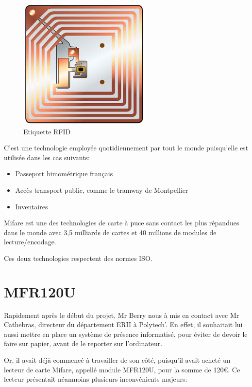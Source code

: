     \begin{figure}[h]
        \begin{center}
            \includegraphics[scale=0.6]{RFIDtag.jpg} 
        \end{center}

        \caption{Etiquette RFID}
        \label{Etiquette RFID}
    \end{figure}


C'est une technologie employée quotidiennement par tout le monde puisqu'elle
est utilisée dans les cas suivants:

    \begin{itemize}
    \item Passeport bimométrique français
    \item Accès transport public, comme le tramway de Montpellier
    \item Inventaires
    \end{itemize}

Mifare est une des technologies de carte à puce sans contact les plus répandues
dans le monde avec 3,5 milliards de cartes et 40 millions de modules de lecture/encodage.

Ces deux technologies respectent des normes ISO.

\section{MFR120U}

Rapidement après le début du projet, Mr Berry nous à mis en contact avec Mr
Cathebras, directeur du département ERII à Polytech'. En effet, il souhaitait lui
aussi mettre en place un système de présence informatisé, pour éviter de devoir
le faire sur papier, avant de le reporter sur l'ordinateur.

Or, il avait déjà commencé à travailler de son côté, puisqu'il avait acheté un lecteur de carte 
Mifare, appellé module MFR120U, pour la somme de 120\euro. Ce lecteur présentait néanmoins
plusieurs inconvénients majeurs:

